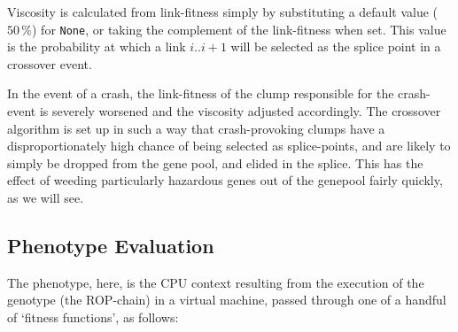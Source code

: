 Viscosity is calculated from link-fitness simply by substituting
a default value ($50\,\%$) for \texttt{None}, or taking the
complement of the link-fitness when set. This value is the probability at
which a link $i..i+1$ will be selected as the splice point in a
crossover event. 

In the event of a crash, the link-fitness of the clump
responsible for the crash-event is severely worsened
and the viscosity adjusted accordingly. The crossover algorithm
is set up in such a way that crash-provoking clumps have a
disproportionately high chance of being selected as
splice-points, and are likely to simply be dropped from the gene
pool, and elided in the splice. This has the effect of weeding
particularly hazardous genes out of the genepool fairly quickly,
as we will see. 






\subsection{Phenotype Evaluation}
The phenotype, here, is the CPU context resulting from the execution of the genotype (the ROP-chain) in a virtual machine, passed through one of a handful of `fitness functions', as follows:

